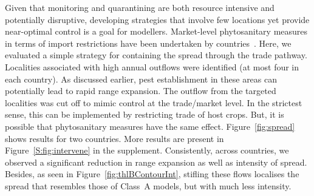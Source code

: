 \documentclass[11pt]{article}
\theoremstyle{definition}
\providecommand{\DIFdelbegin}{} %
\newcommand{\DIFscaledelfig}{0.5}
\newlength{\DIFdelgraphicswidth} %
\newlength{\DIFdelgraphicsheight} %
\newcommand{\DIFdelincludegraphics}[2][]{%
\sbox{\DIFdelgraphicsbox}{\DIFOincludegraphics[#1]{#2}}%
\settoboxwidth{\DIFdelgraphicswidth}{\DIFdelgraphicsbox} %
\settoboxtotalheight{\DIFdelgraphicsheight}{\DIFdelgraphicsbox} %
\scalebox{\DIFscaledelfig}{%
\parbox[b]{\DIFdelgraphicswidth}{\usebox{\DIFdelgraphicsbox}\\[-\baselineskip] \rule{\DIFdelgraphicswidth}{0em}}\llap{\resizebox{\DIFdelgraphicswidth}{\DIFdelgraphicsheight}{%
\setlength{\unitlength}{\DIFdelgraphicswidth}%
\begin{picture}(1,1)%
\thicklines\linethickness{2pt} %
{\color[rgb]{1,0,0}\put(0,0){\framebox(1,1){}}}%
{\color[rgb]{1,0,0}\put(0,0){\line( 1,1){1}}}%
{\color[rgb]{1,0,0}\put(0,1){\line(1,-1){1}}}%
\end{picture}%
}\hspace*{3pt}}} %
} %
\DeclareRobustCommand{\DIFdelbegin}{\DIFOdelbegin \let\includegraphics\DIFdelincludegraphics} %
\begin{document}
Given that monitoring and quarantining are both resource intensive and
potentially disruptive, developing strategies that involve few locations
yet provide near-optimal control is a goal for modellers.  Market-level
phytosanitary measures in terms of import restrictions have been undertaken
by countries~\cite{USDA2012}. Here, we evaluated a simple strategy for
containing the spread through the trade pathway. Localities associated with
high annual outflows were identified (at most four in each country). As
discussed earlier, pest establishment in these areas can potentially lead
to rapid range expansion. The outflow from the targeted localities was cut
off to mimic control at the trade/market level. In the strictest sense,
this can be implemented by restricting trade of host crops. But, it is
possible that phytosanitary measures have the same effect.
Figure~\ref{fig:spread} shows results for two countries.  More results are
present in Figure~\ref{S:fig:intervene} in the supplement.  Consistently,
across countries, we observed a significant reduction in range expansion as
well as intensity of spread.  Besides, as seen in
Figure~\ref{fig:thlBContourInt}, stifling these flows localises the spread
that resembles those of Class~A models, but with much less intensity.
\DIFdelbegin %
\end{document}

